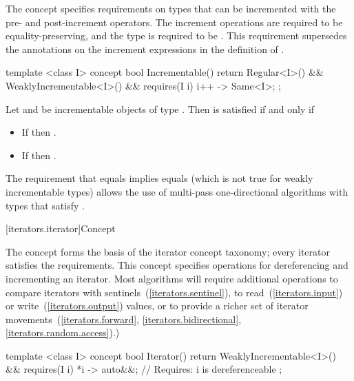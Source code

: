 \pnum
The  concept specifies requirements on types that can be incremented with the pre-
and post-increment operators. The increment operations are required to be equality-preserving,
and the type is required to be . \enternote This requirement
supersedes the annotations on the increment expressions in the definition of
. \exitnote

%
\begin{codeblock}
  template <class I>
  concept bool Incrementable() {
    return Regular<I>() &&
      WeaklyIncrementable<I>() &&
      requires(I i) {
        { i++ } -> Same<I>;
      };
  }
\end{codeblock}

\pnum
Let  and  be incrementable objects of type .
Then  is satisfied
if and only if

\begin{itemize}
\item If  then .
\item If  then .
\end{itemize}

\pnum
\enternote The requirement that  equals  implies  equals 
(which is not true for weakly incrementable types) allows the use of multi-pass one-directional
algorithms with types that satisfy .\exitnote

[iterators.iterator]{Concept }

\pnum
The  concept forms
the basis of the iterator concept taxonomy; every iterator satisfies the
 requirements. This
concept specifies operations for dereferencing and incrementing
an iterator. Most algorithms will require additional operations
to compare iterators with sentinels~(\ref{iterators.sentinel}), to
read~(\ref{iterators.input}) or write~(\ref{iterators.output}) values, or
to provide a richer set of iterator movements~(\ref{iterators.forward},
\ref{iterators.bidirectional}, \ref{iterators.random.access}).)

%
\begin{codeblock}
  template <class I>
  concept bool Iterator() {
    return WeaklyIncrementable<I>() &&
      requires(I i) {
        { *i } -> auto&&; // Requires: i is dereferenceable
      };
  }
\end{codeblock}

